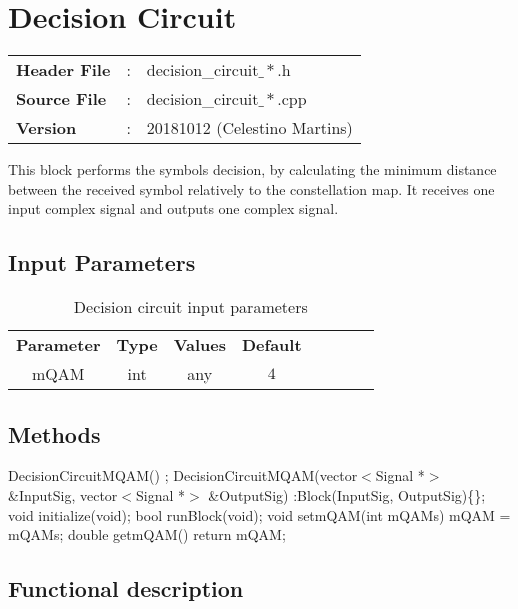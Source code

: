 \clearpage

\section{Decision Circuit}

\begin{tcolorbox}	
	\begin{tabular}{p{2.75cm} p{0.2cm} p{10.5cm}} 	
		\textbf{Header File}   &:& decision\_circuit$\_*$.h \\
		\textbf{Source File}   &:& decision\_circuit$\_*$.cpp \\
        \textbf{Version}       &:& 20181012 (Celestino Martins) \\
	\end{tabular}
\end{tcolorbox}

This block performs the symbols decision, by calculating the minimum distance between the received symbol relatively to the constellation map. It receives one input complex signal and outputs one complex signal.

\subsection*{Input Parameters}

\begin{table}[h]
	\centering
	\begin{tabular}{|c|c|c|c|cccc}
		\cline{1-4}
		\textbf{Parameter} & \textbf{Type} & \textbf{Values} &   \textbf{Default}& \\ \cline{1-4}
		mQAM                  & int & any & $4$ \\ \cline{1-4}		
	\end{tabular}
	\caption{Decision circuit input parameters}
	\label{table:cpe_in_par_vv}
\end{table}


\subsection*{Methods}

DecisionCircuitMQAM() {};
\bigbreak
DecisionCircuitMQAM(vector$<$Signal *$>$ \&InputSig, vector$<$Signal *$>$ \&OutputSig) :Block(InputSig, OutputSig)\{\};
\bigbreak
void initialize(void);
\bigbreak
bool runBlock(void);
\bigbreak
void setmQAM(int mQAMs) { mQAM = mQAMs; }
\bigbreak
double getmQAM() { return mQAM; }

\subsection*{Functional description}

